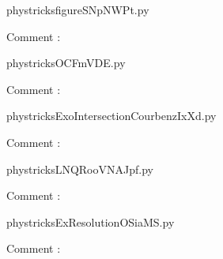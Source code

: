 
    \newcommand{\CaptionFigfigureSNpNWPt}{<+Type your caption here+>}
    \begin{center}
        
    \end{center}
    phystricksfigureSNpNWPt.py

    Comment : 

    \clearpage
    


    \newcommand{\CaptionFigOCFmVDE}{<+Type your caption here+>}
    \begin{center}
        
    \end{center}
    phystricksOCFmVDE.py

    Comment : 

    \clearpage
    


    \newcommand{\CaptionFigExoIntersectionCourbenzIxXd}{<+Type your caption here+>}
    \begin{center}
        
    \end{center}
    phystricksExoIntersectionCourbenzIxXd.py

    Comment : 

    \clearpage
    


    \newcommand{\CaptionFigLNQRooVNAJpf}{<+Type your caption here+>}
    \begin{center}
        
    \end{center}
    phystricksLNQRooVNAJpf.py

    Comment : 

    \clearpage
    


    \newcommand{\CaptionFigExResolutionOSiaMS}{<+Type your caption here+>}
    \begin{center}
        
    \end{center}
    phystricksExResolutionOSiaMS.py

    Comment : 

    \clearpage
    


